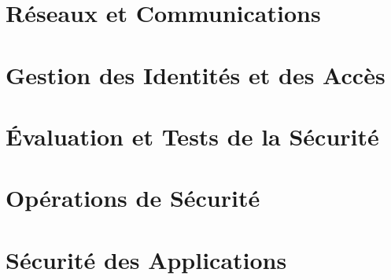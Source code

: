\documentclass[12pt, a4paper, twoside, openright]{book}
\begin{document}


\part{Réseaux et Communications}



\part{Gestion des Identités et des Accès}



\part{Évaluation et Tests de la Sécurité}



\part{Opérations de Sécurité}



\part{Sécurité des Applications}
\end{document}
